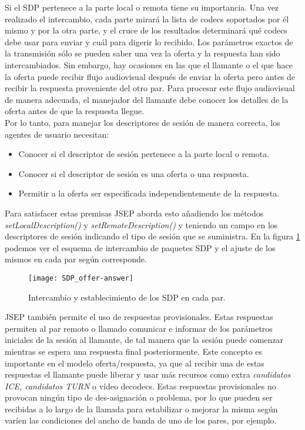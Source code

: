 Si el SDP pertenece a la parte local o remota tiene su importancia. Una vez realizado el intercambio, cada parte mirará la lista de codecs soportados por él mismo y por la otra parte, y el cruce de los resultados determinará qué codecs debe usar para enviar y cuál para digerir lo recibido. Los parámetros exactos de la transmisión sólo se pueden saber una vez la oferta y la respuesta han sido intercambiados. Sin embargo, hay ocasiones en las que el llamante o el que hace la oferta puede recibir flujo audiovisual después de enviar la oferta pero antes de recibir la respuesta proveniente del otro par. Para procesar este flujo audiovisual de manera adecuada, el manejador del llamante debe conocer los detalles de la oferta antes de que la respuesta llegue.\\

Por lo tanto, para manejar los descriptores de sesión de manera correcta, los agentes de usuario necesitan:

\begin{itemize}
\item Conocer si el descriptor de sesión pertenece a la parte local o remota.
\item Conocer si el descriptor de sesión es una oferta o una respuesta.
\item Permitir a la oferta ser especificada independientemente de la respuesta.
\end{itemize}

Para satisfacer estas premisas JSEP aborda esto añadiendo los métodos \emph{setLocalDescription()} y \emph{setRemoteDescription()} y teniendo un campo en los descriptores de sesión indicando el tipo de sesión que se suministra. En la figura \ref{fig:sdp-oferta-respuesta} podemos ver el esquema de intercambio de paquetes SDP y el ajuste de los mismos en cada par según corresponde.\\

\begin{figure}[h!]
\centering
\texttt{[image: SDP\_offer-answer]}
\caption{Intercambio y establecimiento de los SDP en cada par.}
\label{fig:sdp-oferta-respuesta}
\end{figure}

JSEP también permite el uso de respuestas provisionales. Estas respuestas permiten al par remoto o llamado comunicar e informar de los parámetros iniciales de la sesión al llamante, de tal manera que la sesión puede comenzar mientras se espera una respuesta final posteriormente. Este concepto es importante en el modelo oferta/respuesta, ya que al recibir una de estas respuestas el llamante puede liberar y usar más recursos como extra \textit{candidatos ICE, candidatos TURN} o vídeo decodecs. Estas respuestas provisionales no provocan ningún tipo de des-asignación o problema, por lo que pueden ser recibidas a lo largo de la llamada para estabilizar o mejorar la misma según varíen las condiciones del ancho de banda de uno de los pares, por ejemplo.\\

